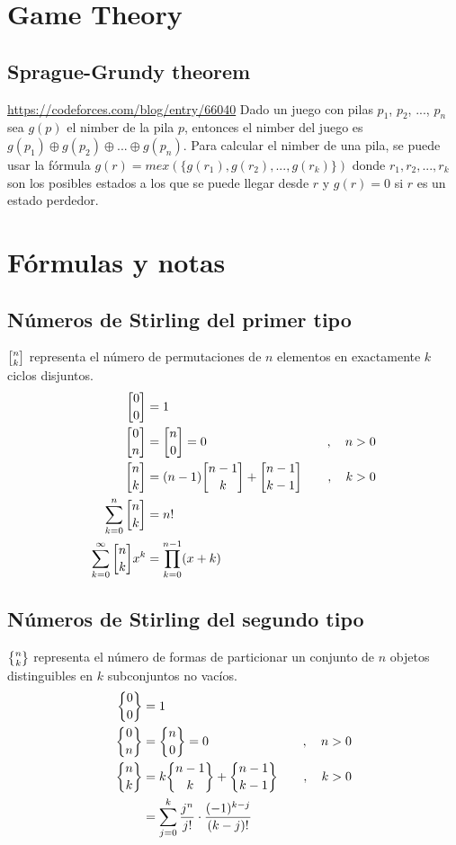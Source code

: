 \section{Game Theory}
	\subsection{Sprague-Grundy theorem}
	\url{https://codeforces.com/blog/entry/66040}
	Dado un juego con pilas $p_1$, $p_2$, ..., $p_n$ sea $g(p)$ el nimber de la pila $p$, 
	entonces el nimber del juego es $g(p_1) \oplus g(p_2) \oplus ... \oplus g(p_n)$.
	Para calcular el nimber de una pila, se puede usar la fórmula $g(r) = mex(\{g(r_1), g(r_2), ..., g(r_k)\})$
	donde $r_1, r_2, ..., r_k$ son los posibles estados a los que se puede llegar desde $r$ y $g(r)=0$ si $r$ es un estado perdedor.


	\section{Fórmulas y notas}
	\subsection{Números de Stirling del primer tipo}
		$\stirlingI{n}{k}$ representa el número de permutaciones de $n$ elementos en exactamente $k$ ciclos disjuntos.
		\begin{align*}
			\stirlingI{0}{0} &= 1 \\
			\stirlingI{0}{n} &= \stirlingI{n}{0} = 0 \quad &, \quad n>0 \\
			\stirlingI{n}{k} &= (n-1)\stirlingI{n-1}{k} + \stirlingI{n-1}{k-1} \quad &, \quad k>0 \\
			\sum_{k=0}^{n} \stirlingI{n}{k} &= n! \\
			\sum_{k=0}^{\infty} \stirlingI{n}{k} x^k &= \prod_{k=0}^{n-1}(x+k)
		\end{align*}
	
	\subsection{Números de Stirling del segundo tipo}
		$\stirlingII{n}{k}$ representa el número de formas de particionar un conjunto de $n$ objetos distinguibles en $k$ subconjuntos no vacíos.
		\begin{align*}
			\stirlingII{0}{0} &= 1 \\
			\stirlingII{0}{n} &= \stirlingII{n}{0} = 0 \quad &, \quad n>0 \\
			\stirlingII{n}{k} &= k\stirlingII{n-1}{k} + \stirlingII{n-1}{k-1} \quad &, \quad k>0 \\
			&= \sum_{j=0}^{k} \dfrac{j^n}{j!} \cdot \dfrac{(-1)^{k-j}}{(k-j)!}
		\end{align*}
	
